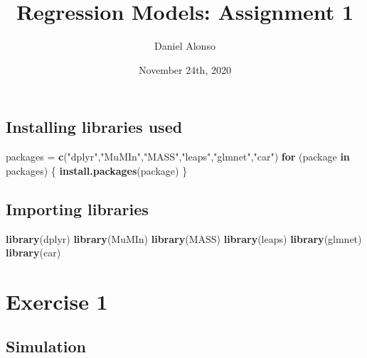 \documentclass[]{article}
\title{Regression Models: Assignment 1}
\author{Daniel Alonso}
\date{November 24th, 2020}
\newenvironment{Shaded}{\begin{snugshade}}{\end{snugshade}}
\newcommand{\ControlFlowTok}[1]{\textcolor[rgb]{0.13,0.29,0.53}{\textbf{#1}}}
\newcommand{\KeywordTok}[1]{\textcolor[rgb]{0.13,0.29,0.53}{\textbf{#1}}}
\newcommand{\NormalTok}[1]{#1}
\newcommand{\StringTok}[1]{\textcolor[rgb]{0.31,0.60,0.02}{#1}}
\begin{document}
\maketitle

\hypertarget{installing-libraries-used}{%
\subsection{Installing libraries used}\label{installing-libraries-used}}

\begin{Shaded}
\begin{Highlighting}[]
\NormalTok{packages =}\StringTok{ }\KeywordTok{c}\NormalTok{(}\StringTok{"dplyr"}\NormalTok{,}\StringTok{"MuMIn"}\NormalTok{,}\StringTok{"MASS"}\NormalTok{,}\StringTok{"leaps"}\NormalTok{,}\StringTok{"glmnet"}\NormalTok{,}\StringTok{"car"}\NormalTok{)}
\ControlFlowTok{for}\NormalTok{ (package }\ControlFlowTok{in}\NormalTok{ packages) \{}
    \KeywordTok{install.packages}\NormalTok{(package)}
\NormalTok{\}}
\end{Highlighting}
\end{Shaded}

\hypertarget{importing-libraries}{%
\subsection{Importing libraries}\label{importing-libraries}}

\begin{Shaded}
\begin{Highlighting}[]
\KeywordTok{library}\NormalTok{(dplyr)}
\KeywordTok{library}\NormalTok{(MuMIn)}
\KeywordTok{library}\NormalTok{(MASS)}
\KeywordTok{library}\NormalTok{(leaps)}
\KeywordTok{library}\NormalTok{(glmnet)}
\KeywordTok{library}\NormalTok{(car)}
\end{Highlighting}
\end{Shaded}

\newpage

\hypertarget{exercise-1}{%
\section{Exercise 1}\label{exercise-1}}

\hypertarget{simulation}{%
\subsection{Simulation}\label{simulation}}
\end{document}
